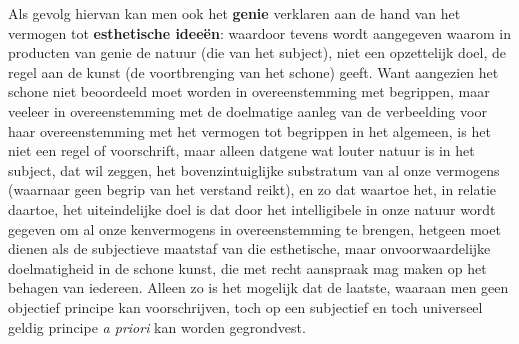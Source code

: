 Als gevolg hiervan kan men ook het \textbf{genie} verklaren aan de hand van het vermogen tot \textbf{esthetische ideeën}: waardoor tevens wordt aangegeven waarom in producten van genie de natuur (die van het subject), niet een opzettelijk doel, de regel aan de kunst (de voortbrenging van het schone) geeft. Want aangezien het schone niet beoordeeld moet worden in overeenstemming met begrippen, maar veeleer in overeenstemming met de doelmatige aanleg van de verbeelding voor haar overeenstemming met het vermogen tot begrippen in het algemeen, is het niet een regel of voorschrift, maar alleen datgene wat louter natuur is in het subject, dat wil zeggen, het bovenzintuiglijke substratum van al onze vermogens (waarnaar geen begrip van het verstand reikt), en zo dat waartoe het, in relatie daartoe, het uiteindelijke doel is dat door het intelligibele in onze natuur wordt gegeven om al onze kenvermogens in overeenstemming te brengen, hetgeen moet dienen als de subjectieve maatstaf van die esthetische, maar onvoorwaardelijke doelmatigheid in de schone kunst, die met recht aanspraak mag maken op het behagen van iedereen. Alleen zo is het mogelijk dat de laatste, waaraan men geen objectief principe kan voorschrijven, toch op een subjectief en toch universeel geldig principe \textit{a priori} kan worden gegrondvest.

